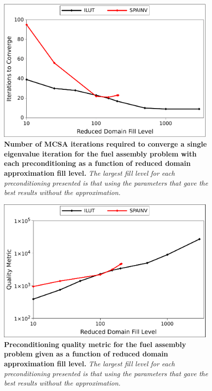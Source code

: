 \begin{figure}[t!]
  \begin{center}
    \includegraphics[width=4.25in]{chapters/spn_equations/rda_iterations.pdf}
  \end{center}
  \caption{\textbf{Number of MCSA iterations required to converge a
      single eigenvalue iteration for the fuel assembly problem with
      each preconditioning as a function of reduced domain
      approximation fill level.} \textit{The largest fill level for
      each preconditioning presented is that using the parameters that
      gave the best results without the approximation.}}
  \label{fig:rda_iterations}
\end{figure}

\begin{figure}[t!]
  \begin{center}
    \includegraphics[width=4.25in]{chapters/spn_equations/rda_quality.pdf}
  \end{center}
  \caption{\textbf{Preconditioning quality metric for the fuel
      assembly problem given as a function of reduced domain
      approximation fill level.} \textit{The largest fill level for
      each preconditioning presented is that using the parameters that
      gave the best results without the approximation.}}
  \label{fig:rda_quality}
\end{figure}

